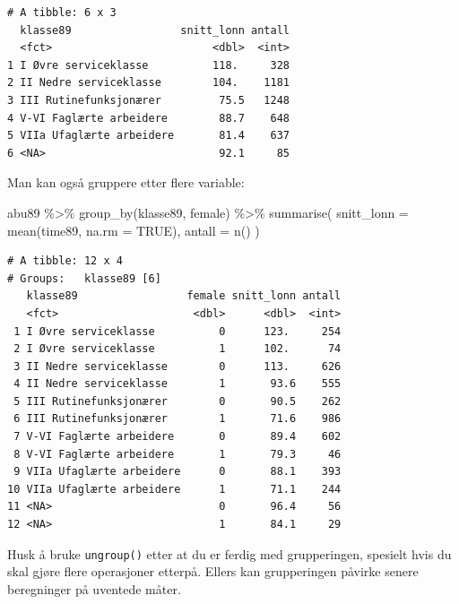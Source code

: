 \documentclass[
  norsk,
  letterpaper,
  DIV=11,
  numbers=noendperiod]{scrreprt}
\newenvironment{Shaded}{\begin{snugshade}}{\end{snugshade}}
\newcommand{\AttributeTok}[1]{\textcolor[rgb]{0.40,0.45,0.13}{#1}}
\newcommand{\ConstantTok}[1]{\textcolor[rgb]{0.56,0.35,0.01}{#1}}
\newcommand{\FunctionTok}[1]{\textcolor[rgb]{0.28,0.35,0.67}{#1}}
\newcommand{\NormalTok}[1]{\textcolor[rgb]{0.00,0.23,0.31}{#1}}
\newcommand{\SpecialCharTok}[1]{\textcolor[rgb]{0.37,0.37,0.37}{#1}}
\theoremstyle{definition}
\theoremstyle{remark}
\begin{document}
\begin{verbatim}
# A tibble: 6 x 3
  klasse89                 snitt_lonn antall
  <fct>                         <dbl>  <int>
1 I Øvre serviceklasse          118.     328
2 II Nedre serviceklasse        104.    1181
3 III Rutinefunksjonærer         75.5   1248
4 V-VI Faglærte arbeidere        88.7    648
5 VIIa Ufaglærte arbeidere       81.4    637
6 <NA>                           92.1     85
\end{verbatim}

Man kan også gruppere etter flere variable:

\begin{Shaded}
\begin{Highlighting}[]
\NormalTok{abu89 }\SpecialCharTok{\%\textgreater{}\%}
  \FunctionTok{group\_by}\NormalTok{(klasse89, female) }\SpecialCharTok{\%\textgreater{}\%}
  \FunctionTok{summarise}\NormalTok{(}
    \AttributeTok{snitt\_lonn =} \FunctionTok{mean}\NormalTok{(time89, }\AttributeTok{na.rm =} \ConstantTok{TRUE}\NormalTok{),}
    \AttributeTok{antall     =} \FunctionTok{n}\NormalTok{()}
\NormalTok{  )}
\end{Highlighting}
\end{Shaded}

\begin{verbatim}
# A tibble: 12 x 4
# Groups:   klasse89 [6]
   klasse89                 female snitt_lonn antall
   <fct>                     <dbl>      <dbl>  <int>
 1 I Øvre serviceklasse          0      123.     254
 2 I Øvre serviceklasse          1      102.      74
 3 II Nedre serviceklasse        0      113.     626
 4 II Nedre serviceklasse        1       93.6    555
 5 III Rutinefunksjonærer        0       90.5    262
 6 III Rutinefunksjonærer        1       71.6    986
 7 V-VI Faglærte arbeidere       0       89.4    602
 8 V-VI Faglærte arbeidere       1       79.3     46
 9 VIIa Ufaglærte arbeidere      0       88.1    393
10 VIIa Ufaglærte arbeidere      1       71.1    244
11 <NA>                          0       96.4     56
12 <NA>                          1       84.1     29
\end{verbatim}

\begin{tcolorbox}[enhanced jigsaw, breakable, colbacktitle=quarto-callout-tip-color!10!white, arc=.35mm, leftrule=.75mm, bottomrule=.15mm, colback=white, coltitle=black, opacityback=0, toptitle=1mm, title=\textcolor{quarto-callout-tip-color}{\faLightbulb}\hspace{0.5em}{Tips}, colframe=quarto-callout-tip-color-frame, toprule=.15mm, opacitybacktitle=0.6, titlerule=0mm, bottomtitle=1mm, rightrule=.15mm, left=2mm]

Husk å bruke \texttt{ungroup()} etter at du er ferdig med grupperingen,
spesielt hvis du skal gjøre flere operasjoner etterpå. Ellers kan
grupperingen påvirke senere beregninger på uventede måter.

\end{tcolorbox}
\end{document}
